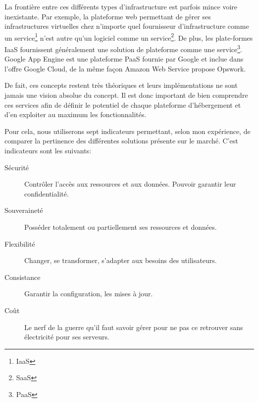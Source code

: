 \documentclass[11pt, a4paper ]{article}
\begin{document}
\begin{spacing}{1.5}
La frontière entre ces différents types d'infrastructure est parfois mince voire inexistante. Par exemple, la plateforme web permettant de gérer ses infrastructures virtuelles chez n'importe quel fournisseur d'infrastructure comme un service\footnote{IaaS} n'est autre qu'un logiciel comme un service\footnote{SaaS}. De plus, les plate-formes IaaS fournissent généralement une solution de plateforme comme une service\footnote{PaaS}. Google App Engine est une plateforme PaaS fournie par Google et inclue dans l'offre Google Cloud, de la même façon Amazon Web Service propose Opswork.

De fait, ces concepts restent très théoriques et leurs implémentations ne sont jamais une vision absolue du concept. Il est donc important de bien comprendre ces services afin de définir le potentiel de chaque plateforme d'hébergement et d'en exploiter au maximum les fonctionnalités.

Pour cela, nous utiliserons sept indicateurs permettant, selon mon expérience, de comparer la pertinence des différentes solutions présente sur le marché. C'est indicateurs sont les suivants:

\begin{description}

	\item[Sécurité]
		Contrôler l'accès aux ressources et aux données. Pouvoir garantir leur confidentialité.

	\item[Souveraineté]
		Posséder totalement ou partiellement ses ressources et données.

	\item[Flexibilité]
		Changer, se transformer, s'adapter aux besoins des utilisateurs.

	\item[Consistance]
		Garantir la configuration, les mises à jour.

	\item[Coût]
		Le nerf de la guerre qu'il faut savoir gérer pour ne pas ce retrouver sans électricité pour ses serveurs.


\end{description}
\end{spacing}
\end{document}
